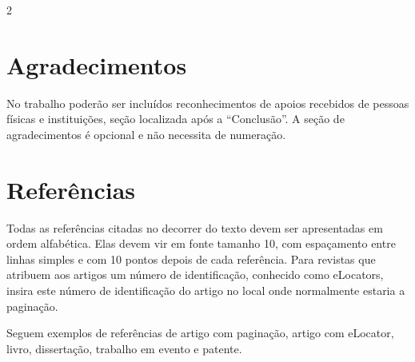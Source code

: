 \documentclass[a4paper,12pt,fleqn]{article}
\begin{document}
\begin{multicols}{2}
		\section*{Agradecimentos}
		No trabalho poderão ser incluídos reconhecimentos de apoios recebidos de pessoas físicas e instituições, seção localizada após a “Conclusão”. A seção de agradecimentos é opcional e não necessita de numeração.
		

	\section*{Referências}
	
	Todas as referências citadas no decorrer do texto devem ser apresentadas em ordem alfabética. Elas devem vir em fonte tamanho 10, com espaçamento entre linhas simples e com 10 pontos depois de cada referência. Para revistas que atribuem aos artigos um número de identificação, conhecido como eLocators, insira este número de identificação do artigo no local onde normalmente estaria a paginação. 

	Seguem exemplos de referências de artigo com paginação, artigo com eLocator, livro, dissertação, trabalho em evento e patente.
	
	\begingroup
	\renewcommand{\section}[2]{} 
	
	\makeatletter
	\renewcommand{\@biblabel}[1]{}
	
	\renewenvironment{thebibliography}[1]{%
		\list{}{%
			\setlength{\leftmargin}{0pt}  %
			\setlength{\itemindent}{0pt}  %
			\setlength{\labelwidth}{0pt}  %
			\setlength{\labelsep}{0pt}    %
			\setlength{\itemsep}{10pt}    %
			\setlength{\parsep}{0pt}
		}%
		\sloppy      %
		\justifying  %
	}{%
		\endlist
	}
	\makeatother
	
	\fontsize{10}{12}\selectfont

	
	
	\endgroup

	\end{multicols}
\end{document}
